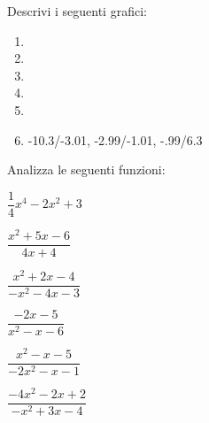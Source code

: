 \begin{esercizio}\label{ese:stufun.2g}
Descrivi i seguenti grafici:

\begin{multicols}{2}
\begin{enumerate} [left=0pt, label=\alph*)]
\item \myp 
{} %
\item \myp 
{}%
\item \myp 
{}%
\item \myp 
{} %
\item \myp 
{} %
\item \myp 
{} 
{-10.3/-3.01, -2.99/-1.01, -.99/6.3}%
\end{enumerate}
\end{multicols}
\end{esercizio}

\begin{esercizio}\label{ese:stufun.2e}
Analizza le seguenti funzioni:
\begin{multicols}{3}
 \begin{enumeratea}
  \item \(\dfrac{1}{4}x^4-2x^2+3\) %
  \item \(\dfrac{x^2+5x-6}{4x+4}\) %
  \item \(\dfrac{x^2+2x-4}{-x^2-4x-3}\) %
  \item \(\dfrac{-2x-5}{x^2-x-6}\) %
  \item \(\dfrac{x^2-x-5}{-2x^2-x-1}\) %
  \item \(\dfrac{-4x^2-2x+2}{-x^2+3x-4}\) %
 \end{enumeratea}
\end{multicols}
\end{esercizio}

\bigskip

